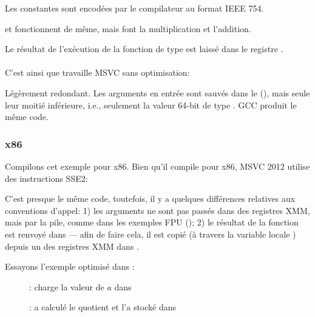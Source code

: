 Les constantes sont encodées par le compilateur au format IEEE 754.

 et  fonctionnent de même, mais font la multiplication et l'addition.

Le résultat de l'exécution de la fonction de type \Tdouble est laissé dans le registre
.\\
\\
C'est ainsi que travaille MSVC sans optimisation:



Légèrement redondant.
Les arguments en entrée sont sauvés dans le  (),
mais seule leur moitié inférieure, i.e., seulement la valeur 64-bit de type \Tdouble.
GCC produit le même code.

\subsubsection{x86}

Compilons cet exemple pour x86. Bien qu'il compile pour x86, MSVC 2012 utilise des
instructions SSE2:





C'est presque le même code, toutefois, il y a quelques différences relatives aux
conventions d'appel:
1) les arguments ne sont pas passés dans des registres XMM, mais par la pile, comme
dans les exemples FPU ();
2) le résultat de la fonction est renvoyé dans  --- afin de faire cela, il
est copié (à travers la variable locale ) depuis un des registres XMM dans
.

\clearpage
Essayons l'exemple optimisé dans \olly:

\begin{figure}[H]
\centering
{}
\caption{\olly:  charge la valeur de $a$ dans }
\label{fig:FPU_SIMD_simple_olly1}
\end{figure}

\clearpage
\begin{figure}[H]
\centering
{}
\caption{\olly:  a calculé le \gls{quotient} 
et l'a stocké dans }
\label{fig:FPU_SIMD_simple_olly2}
\end{figure}

